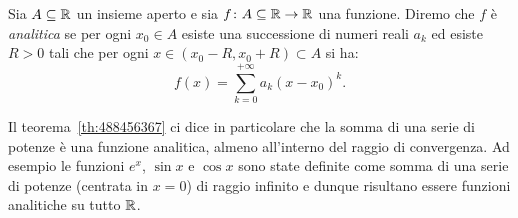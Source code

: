 \begin{definition}
Sia $A\subseteq \mathbb R$ un insieme aperto e sia
$f\colon A\subseteq \mathbb R \to \mathbb R$ una funzione. Diremo che
$f$ è \emph{analitica} se per ogni $x_0\in A$ esiste una successione
di numeri reali $a_k$ ed esiste $R>0$ tali che per ogni $x\in (x_0-R,x_0+R)\subset A$
si ha:
\[
  f(x) = \sum_{k=0}^{+\infty} a_k (x-x_0)^k.
\]
\end{definition}

Il teorema~\ref{th:488456367} ci dice in particolare che la somma di una serie
di potenze è una funzione analitica, almeno all'interno del raggio di convergenza.
Ad esempio le funzioni $e^x$, $\sin x$ e $\cos x$ sono state definite
come somma di una serie di potenze (centrata in $x=0$) di raggio infinito
e dunque risultano essere funzioni analitiche su tutto $\mathbb R$.


